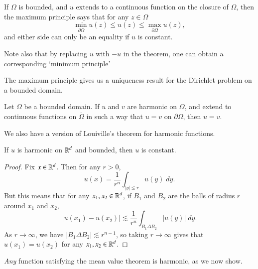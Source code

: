\begin{remark}
    If $\Omega$ is bounded, and $u$ extends to a continuous function on the closure of $\Omega$, then the maximum principle says that for any $z \in \Omega$
    \[ \min_{\partial \Omega} u(z) \leq u(z) \leq \max_{\partial \Omega} u(z), \]
    and either side can only be an equality if $u$ is constant.
\end{remark}

\begin{remark}
    Note also that by replacing $u$ with $-u$ in the theorem, one can obtain a corresponding `minimum principle'
\end{remark}

The maximum principle gives us a uniqueness result for the Dirichlet problem on a bounded domain.

\begin{theorem}
    Let $\Omega$ be a bounded domain. If $u$ and $v$ are harmonic on $\Omega$, and extend to continuous functions on $\overline{\Omega}$ in such a way that $u = v$ on $\partial \Omega$, then $u = v$.
\end{theorem}

We also have a version of Louiville's theorem for harmonic functions.

\begin{theorem}
    If $u$ is harmonic on $\operatorname{\mathbb{R}}^d$ and bounded, then $u$ is constant.
\end{theorem}
\begin{proof}
    Fix $x \in \operatorname{\mathbb{R}}^d$. Then for any $r > 0$,
    \[ u(x) = \frac{1}{r^n} \int_{|y| \leq r} u(y)\; dy. \]
    But this means that for any $x_1,x_2 \in \operatorname{\mathbb{R}}^d$, if $B_1$ and $B_2$ are the balls of radius $r$ around $x_1$ and $x_2$,
    \[ |u(x_1) - u(x_2)| \lesssim \frac{1}{r^n} \int_{B_1 \Delta B_2} |u(y)|\; dy. \]
    As $r \to \infty$, we have $|B_1 \Delta B_2| \lesssim r^{n-1}$, so taking $r \to \infty$ gives that $u(x_1) = u(x_2)$ for any $x_1,x_2 \in \operatorname{\mathbb{R}}^d$.
\end{proof}

\emph{Any} function satisfying the mean value theorem is harmonic, as we now show.

